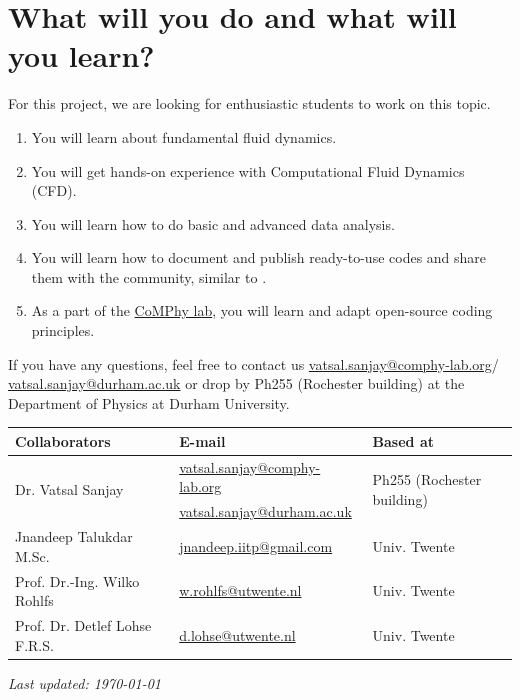 \documentclass[11pt]{article}
\begin{document}
\section*{What will you do and what will you learn?}
For this project, we are looking for enthusiastic students to work on this topic.
\begin{enumerate}
\itemsep0em
\item You will learn about fundamental fluid dynamics.
\item You will get hands-on experience with Computational Fluid Dynamics (CFD).
\item You will learn how to do basic and advanced data analysis.
\item You will learn how to document and publish ready-to-use codes and share them with the community, similar to \citet{basiliskVatsal, basiliskVatsalDropFilm, basiliskVatsalViscousBouncing}. 
\item As a part of the \href{https://comphy-lab.org}{CoMPhy lab}, you will learn and adapt open-source coding principles. 

\end{enumerate}

If you have any questions, feel free to contact us \href{mailto:vatsal.sanjay@comphy-lab.org}{vatsal.sanjay@comphy-lab.org}/\\\href{mailto:vatsal.sanjay@durham.ac.uk}{vatsal.sanjay@durham.ac.uk} or drop by Ph255 (Rochester building) at the Department of Physics at Durham University.

\begin{center}
\begin{tabular}{|l|l|l|}
\hline \textbf{Collaborators} & \textbf{E-mail} & \textbf{Based at} \\
\hline \multirow{2}{*}{Dr. Vatsal Sanjay} & \href{mailto:vatsal.sanjay@comphy-lab.org}{vatsal.sanjay@comphy-lab.org} & \multirow{2}{*}{Ph255 (Rochester building)} \\
& \href{mailto:vatsal.sanjay@durham.ac.uk}{vatsal.sanjay@durham.ac.uk} & \\
\hline Jnandeep Talukdar M.Sc. & \href{mailto:jnandeep.iitp@gmail.com}{jnandeep.iitp@gmail.com} & Univ. Twente \\
\hline Prof. Dr.-Ing. Wilko Rohlfs   & \href{mailto:w.rohlfs@utwente.nl }{w.rohlfs@utwente.nl }& Univ. Twente \\
\hline Prof. Dr. Detlef Lohse F.R.S. & \href{mailto:d.lohse@utwente.nl}{d.lohse@utwente.nl} & Univ. Twente  \\
\hline
\end{tabular}
\end{center}

\vspace{1em}
\noindent\textit{Last updated: \today}

\printbibliography
\end{document}
